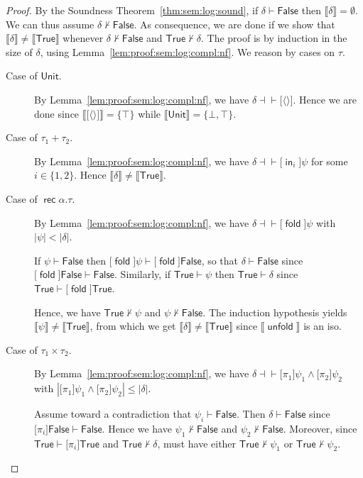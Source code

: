 \documentclass[%
  a4paper,
  UKenglish,
  cleveref,
  autoref,
  thm-restate,
  numberwithinsect,
]{lipics-v2021}
\newcommand\thesis{\vdash}
\newcommand\defthesisiff{\dashv\vdash}
\newcommand\thesisiff{\mathrel{\defthesisiff}}
\newcommand\pair[1]{{\langle #1\rangle}}
\newcommand\I[1]{\llbracket #1 \rrbracket} %
\newcommand\temp[1]{\mathsf{#1}}
\newcommand\True{\temp{True}}
\newcommand\False{\temp{False}}
\newcommand\term[1]{\mathsf{#1}}
\newcommand\type[1]{\term{#1}}
\newcommand\inj{\mathop{\term{in}}}
\newcommand\fold{\mathop{\term{fold}}}
\newcommand\unfold{\mathop{\term{unfold}}}
\newcommand\Unit{\type{Unit}}
\newcommand\rec{\mathop{\type{rec}}}	%
\newcommand\TV{\alpha}		%
\newcommand\PT{\tau}		%
\newcommand\form[1]{\lbrack #1 \rbrack}
\begin{document}
\begin{proof}
By the Soundness Theorem~\ref{thm:sem:log:sound},
if $\delta \thesis \False$ then $\I\delta = \emptyset$.
We can thus assume $\delta \not\thesis \False$.
%
As consequence, we are done if we show that $\I\delta \neq \I\True$
whenever $\delta \not\thesis \False$ and $\True \not\thesis \delta$.
%
The proof is by induction in the size of $\delta$,
using Lemma~\ref{lem:proof:sem:log:compl:nf}.
We reason by cases on $\PT$.
\begin{description}
\item[Case of $\Unit$.]
By Lemma~\ref{lem:proof:sem:log:compl:nf},
we have $\delta \thesisiff \form{\pair{}}$.
Hence we are done since $\I{\form{\pair{}}} = \{\top \}$
while $\I\Unit = \{\bot,\top\}$.

\item[Case of $\PT_1 + \PT_2$.]
By Lemma~\ref{lem:proof:sem:log:compl:nf},
we have $\delta \thesisiff \form{\inj_i} \psi$
for some $i \in \{1,2\}$.
Hence $\I\delta \neq \I\True$.

\item[Case of $\rec\TV.\PT$.]
By Lemma~\ref{lem:proof:sem:log:compl:nf},
we have $\delta \thesisiff \form\fold\psi$
with $|\psi| < |\delta|$.

If $\psi \thesis \False$
then $\form{\fold} \psi \thesis \form{\fold}\False$,
so that $\delta \thesis \False$
since $\form{\fold}\False \thesis \False$.
%
Similarly, 
if $\True \thesis \psi$
then $\True \thesis \delta$
since $\True \thesis \form{\fold}\True$.

Hence, we have $\True \not\thesis \psi$
and $\psi \not\thesis \False$.
The induction hypothesis yields $\I\psi \neq \I\True$,
from which we get $\I\delta \neq \I\True$
since $\I\unfold$ is an iso.


\item[Case of $\PT_1 \times \PT_2$.]
By Lemma~\ref{lem:proof:sem:log:compl:nf},
we have
$\delta \thesisiff \form{\pi_1}\psi_1 \land \form{\pi_2}\psi_2$
with
\(
  |\form{\pi_1}\psi_1 \land \form{\pi_2}\psi_2| \leq |\delta|
\).

Assume toward a contradiction that $\psi_i \thesis \False$.
Then $\delta \thesis \False$ since $\form{\pi_i}\False \thesis \False$.
Hence we have
$\psi_1 \not\thesis \False$ and $\psi_2 \not\thesis \False$.
%
Moreover, since $\True \thesis \form{\pi_i}\True$
and $\True \not\thesis \delta$,
must have either $\True \not\thesis \psi_1$
or $\True \not\thesis \psi_2$.


\end{description}
\end{proof}
\end{document}
